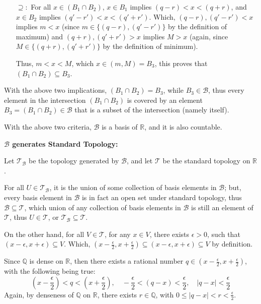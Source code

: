 \documentclass{article}
\begin{document}
\begin{itemize}
\begin{itemize}
        \hfill

        \item[$\supseteq:$] For all $x\in (B_1\cap B_2)$, $x\in B_1$ implies $(q-r)<x<(q+r)$, and $x\in B_2$ implies $(q'-r')<x<(q'+r')$.
        Which, $(q-r),(q'-r')<x$ implies $m<x$ (since $m\in\{(q-r),(q'-r')\}$ by the definition of maximum) and $(q+r),(q'+r')>x$ implies $M>x$
        (again, since $M\in \{(q+r),(q'+r')\}$ by the definition of minimum).

        Thus, $m<x<M$, which $x\in (m,M) = B_3$, this proves that $(B_1\cap B_2)\subseteq B_3$.
    \end{itemize}

    With the above two implications, $(B_1\cap B_2)=B_3$, while $B_3\in \mathcal{B}$, thus every element in the intersection $(B_1\cap B_2)$
    is covered by an element $B_3=(B_1\cap B_2)\in\mathcal{B}$ that is a subset of the intersection (namely itself).
\end{itemize}
With the above two criteria, $\mathcal{B}$ is a basis of $\mathbb{R}$, and it is also countable.

\hfill

\textbf{$\mathcal{B}$ generates Standard Topology:}

Let $\mathcal{T_B}$ be the topology generated by $\mathcal{B}$, and let $\mathcal{T}$ be the standard topology on $\mathbb{R}$.

For all $U\in \mathcal{T_B}$, it is the union of some collection of basis elements in $\mathcal{B}$; but, every basis element in $\mathcal{B}$
is in fact an open set under standard topology, thus $\mathcal{B}\subseteq \mathcal{T}$, which union of any collection of basis elements in $\mathcal{B}$
is still an element of $\mathcal{T}$, thus $U\in \mathcal{T}$, or $\mathcal{T_B}\subseteq \mathcal{T}$.

\hfill

On the other hand, for all $V\in\mathcal{T}$, for any $x\in V$, there exists $\epsilon>0$, such that $(x-\epsilon,x+\epsilon)\subseteq V$.
Which, $(x-\frac{\epsilon}{2},x+\frac{\epsilon}{2})\subseteq (x-\epsilon,x+\epsilon)\subseteq V$ by definition.

Since $\mathbb{Q}$ is dense on $\mathbb{R}$, then there exists a rational number $q\in (x-\frac{\epsilon}{2},x+\frac{\epsilon}{2})$, with the following being true:
$$(x-\frac{\epsilon}{2})<q<(x+\frac{\epsilon}{2}),\quad -\frac{\epsilon}{2}<(q-x)<\frac{\epsilon}{2}, \quad |q-x|<\frac{\epsilon}{2}$$
Again, by denseness of $\mathbb{Q}$ on $\mathbb{R}$, there exists $r\in\mathbb{Q}$, with $0\leq |q-x| <r<\frac{\epsilon}{2}$.
\end{document}

